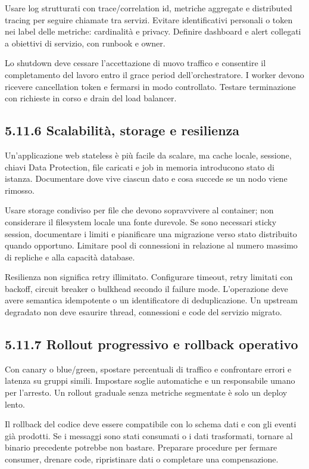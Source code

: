 \documentclass[
  italian,
  10pt,
]{book}
\begin{document}
Usare log strutturati con trace/correlation id, metriche aggregate e
distributed tracing per seguire chiamate tra servizi. Evitare
identificativi personali o token nei label delle metriche: cardinalità e
privacy. Definire dashboard e alert collegati a obiettivi di servizio,
con runbook e owner.

Lo shutdown deve cessare l'accettazione di nuovo traffico e consentire
il completamento del lavoro entro il grace period dell'orchestratore. I
worker devono ricevere cancellation token e fermarsi in modo
controllato. Testare terminazione con richieste in corso e drain del
load balancer.

\subsection{5.11.6 Scalabilità, storage e
resilienza}\label{scalabilituxe0-storage-e-resilienza}

Un'applicazione web stateless è più facile da scalare, ma cache locale,
sessione, chiavi Data Protection, file caricati e job in memoria
introducono stato di istanza. Documentare dove vive ciascun dato e cosa
succede se un nodo viene rimosso.

Usare storage condiviso per file che devono sopravvivere al container;
non considerare il filesystem locale una fonte durevole. Se sono
necessari sticky session, documentare i limiti e pianificare una
migrazione verso stato distribuito quando opportuno. Limitare pool di
connessioni in relazione al numero massimo di repliche e alla capacità
database.

Resilienza non significa retry illimitato. Configurare timeout, retry
limitati con backoff, circuit breaker o bulkhead secondo il failure
mode. L'operazione deve avere semantica idempotente o un identificatore
di deduplicazione. Un upstream degradato non deve esaurire thread,
connessioni e code del servizio migrato.

\subsection{5.11.7 Rollout progressivo e rollback
operativo}\label{rollout-progressivo-e-rollback-operativo}

Con canary o blue/green, spostare percentuali di traffico e confrontare
errori e latenza su gruppi simili. Impostare soglie automatiche e un
responsabile umano per l'arresto. Un rollout graduale senza metriche
segmentate è solo un deploy lento.

Il rollback del codice deve essere compatibile con lo schema dati e con
gli eventi già prodotti. Se i messaggi sono stati consumati o i dati
trasformati, tornare al binario precedente potrebbe non bastare.
Preparare procedure per fermare consumer, drenare code, ripristinare
dati o completare una compensazione.
\end{document}

